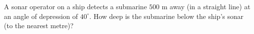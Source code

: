A sonar operator on a ship detects a submarine $500$ m away (in a straight line) at an angle of depression of $40^\circ$. How deep is the submarine below the ship's sonar (to the nearest metre)?
